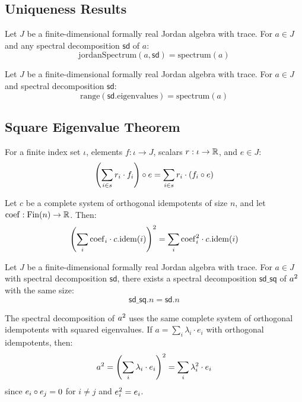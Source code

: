 \subsection{Uniqueness Results}

\begin{theorem}
Let $J$ be a finite-dimensional formally real Jordan algebra with trace. For $a \in J$ and any spectral decomposition $\mathsf{sd}$ of $a$:
\[ \mathrm{jordanSpectrum}(a, \mathsf{sd}) = \mathrm{spectrum}(a) \]
\end{theorem}

\begin{theorem}
Let $J$ be a finite-dimensional formally real Jordan algebra with trace. For $a \in J$ and spectral decomposition $\mathsf{sd}$:
\[ \mathrm{range}(\mathsf{sd}.\mathrm{eigenvalues}) = \mathrm{spectrum}(a) \]
\end{theorem}

\subsection{Square Eigenvalue Theorem}

\begin{lemma}
For a finite index set $\iota$, elements $f : \iota \to J$, scalars $r : \iota \to \mathbb{R}$, and $e \in J$:
\[ \left(\sum_{i \in s} r_i \cdot f_i\right) \circ e = \sum_{i \in s} r_i \cdot (f_i \circ e) \]
\end{lemma}

\begin{theorem}
Let $c$ be a complete system of orthogonal idempotents of size $n$, and let $\mathrm{coef} : \mathrm{Fin}(n) \to \mathbb{R}$. Then:
\[ \left(\sum_i \mathrm{coef}_i \cdot c.\mathrm{idem}(i)\right)^{2} = \sum_i \mathrm{coef}_i^2 \cdot c.\mathrm{idem}(i) \]
\end{theorem}

\begin{theorem}[spectral\_sq]
Let $J$ be a finite-dimensional formally real Jordan algebra with trace. For $a \in J$ with spectral decomposition $\mathsf{sd}$, there exists a spectral decomposition $\mathsf{sd\_sq}$ of $a^{2}$ with the same size:
\[ \mathsf{sd\_sq}.n = \mathsf{sd}.n \]

The spectral decomposition of $a^{2}$ uses the same complete system of orthogonal idempotents with squared eigenvalues. If $a = \sum_i \lambda_i \cdot e_i$ with orthogonal idempotents, then:
\[ a^{2} = \left(\sum_i \lambda_i \cdot e_i\right)^2 = \sum_i \lambda_i^2 \cdot e_i \]
since $e_i \circ e_j = 0$ for $i \ne j$ and $e_i^{2} = e_i$.
\end{theorem}

